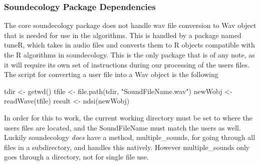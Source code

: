 \subsubsection{Soundecology Package Dependencies}
The core soundecology package does not handle wav file conversion to Wav object that is needed for use in the algorithms. This is handled by a package named tuneR, which takes in audio files and converts them to R objects compatible with the R algorithms in soundecology. This is the only package that is of any note, as it will require its own set of instructions during our processing of the user\textquotesingle s files. The script for converting a user file into a Wav object is the following

\begin{javascriptcode}
  tdir <- getwd()
  tfile <- file.path(tdir, "SoundFileName.wav")
  newWobj <- readWave(tfile)
  result <- ndsi(newWobj)
\end{javascriptcode}

In order for this to work, the current working directory must be set to where the user\textquotesingle s files are located, and the SoundFileName must match the user\textquotesingle s as well. Luckily soundecology \textit{does} have a method, multiple_sounds, for going through all files in a subdirectory, and handles this natively. However multiple_sounds only goes through a directory, not for single file use.

